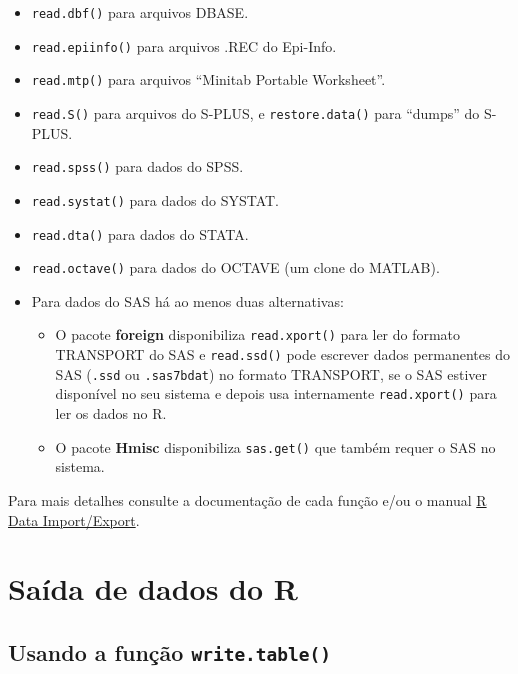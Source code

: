 \documentclass[10pt,a4paper]{book}
\providecommand{\tightlist}{%
  \setlength{\itemsep}{0pt}\setlength{\parskip}{0pt}}
\begin{document}
\begin{itemize}
\tightlist
\item
  \texttt{read.dbf()} para arquivos DBASE.
\item
  \texttt{read.epiinfo()} para arquivos .REC do Epi-Info.
\item
  \texttt{read.mtp()} para arquivos ``Minitab Portable Worksheet''.
\item
  \texttt{read.S()} para arquivos do S-PLUS, e \texttt{restore.data()}
  para ``dumps'' do S-PLUS.
\item
  \texttt{read.spss()} para dados do SPSS.
\item
  \texttt{read.systat()} para dados do SYSTAT.
\item
  \texttt{read.dta()} para dados do STATA.
\item
  \texttt{read.octave()} para dados do OCTAVE (um clone do MATLAB).
\item
  Para dados do SAS há ao menos duas alternativas:

  \begin{itemize}
  \tightlist
  \item
    O pacote \textbf{foreign} disponibiliza \texttt{read.xport()} para
    ler do formato TRANSPORT do SAS e \texttt{read.ssd()} pode escrever
    dados permanentes do SAS (\texttt{.ssd} ou \texttt{.sas7bdat}) no
    formato TRANSPORT, se o SAS estiver disponível no seu sistema e
    depois usa internamente \texttt{read.xport()} para ler os dados no
    R.
  \item
    O pacote \textbf{Hmisc} disponibiliza \texttt{sas.get()} que também
    requer o SAS no sistema.
  \end{itemize}
\end{itemize}

Para mais detalhes consulte a documentação de cada função e/ou o manual
\href{http://cran-r.c3sl.ufpr.br/doc/manuals/r-release/R-data.html}{R
Data Import/Export}.

\section{Saída de dados do R}\label{sauxedda-de-dados-do-r}

\subsection{\texorpdfstring{Usando a função
\texttt{write.table()}}{Usando a função write.table()}}\label{usando-a-funuxe7uxe3o-write.table}
\end{document}
